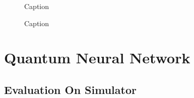 \begin{figure}
    \centering
    \scalebox{0.8}{
        
    }
    \caption{Caption}
    \label{figure:boxplot_noml_distance}
\end{figure}

\begin{figure}
    \centering
    \scalebox{0.8}{
        
    }
    \caption{Caption}
    \label{figure:boxplot_ml_distance}
\end{figure}

\newpage

\section{Quantum Neural Network}

\subsection{Evaluation On Simulator}

